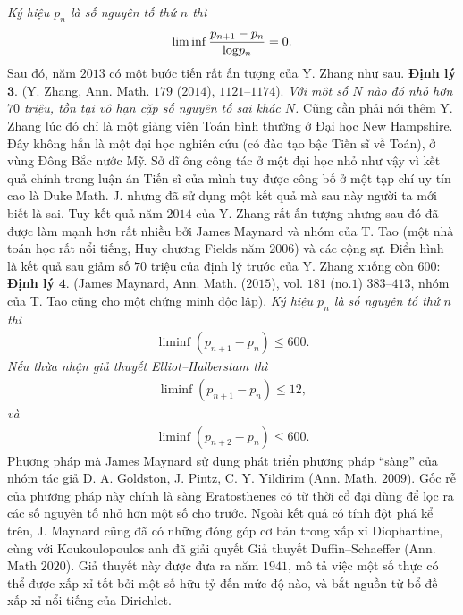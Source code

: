 \begin{multicols}{2}
	\textit{Ký hiệu $p_{n}$ là số nguyên tố thứ $n$ thì}
	\begin{align*}
		\liminf  \frac{p_{n+1}-p_{n}}{{\rm log}p_{n}}=0.
	\end{align*}
	Sau đó, năm $2013$ có một bước tiến rất ấn tượng của Y. Zhang như sau.
	\vskip 0.1cm
	\textbf{\color{duongvaotoanhoc}Định lý} $\pmb{3.}$ (Y. Zhang, Ann. Math. $179$ ($2014$), $1121$--$1174$).
	\textit{Với một số $N$ nào đó nhỏ hơn $70$ triệu, tồn tại vô hạn cặp số nguyên tố sai khác $N$. }
	\vskip 0.1cm
	Cũng cần phải nói thêm Y. Zhang lúc đó chỉ là một giảng viên Toán bình thường ở Đại học New Hampshire. Đây không hẳn là một đại học nghiên cứu (có đào tạo bậc Tiến sĩ về Toán), ở vùng Đông Bắc nước Mỹ. Sở dĩ ông công tác ở một đại học nhỏ như vậy vì kết quả chính trong luận án Tiến sĩ của mình tuy được công bố ở một tạp chí uy tín cao là Duke Math. J. nhưng đã sử dụng một kết quả mà sau này người ta mới biết là sai. Tuy kết quả năm $2014$ của Y. Zhang rất ấn tượng nhưng sau đó đã được làm mạnh hơn rất nhiều bởi James Maynard và nhóm của T. Tao (một nhà toán học rất nổi tiếng, Huy chương Fields năm $2006$) và các cộng sự. Điển hình là kết quả sau giảm số $70$ triệu của định lý trước của Y. Zhang xuống còn $600$:
	\vskip 0.1cm
	\textbf{\color{duongvaotoanhoc}Định lý} $\pmb{4.}$ (James Maynard, Ann. Math. ($2015$), vol. $181$ (no.$1$) $383$--$413$, nhóm của T. Tao cũng cho một chứng minh độc lập).
	\textit{Ký hiệu $p_{n}$ là số nguyên tố thứ $n$ thì}
	\begin{align*}
		\liminf (p_{n+1}-p_{n}) \leq 600. 
	\end{align*}
	\textit{Nếu thừa nhận giả thuyết Elliot--Halberstam thì} 
	\begin{align*}
		\liminf (p_{n+1}-p_{n}) \leq 12,
	\end{align*}
	\textit{và}
	\begin{align*}
		\liminf(p_{n+2}-p_{n}) \leq 600. 
	\end{align*}
	Phương pháp mà James Maynard sử dụng phát triển phương pháp ``sàng'' của nhóm tác giả D. A. Goldston, J. Pintz, C. Y. Yildirim (Ann. Math. $2009$). Gốc rễ của phương pháp này chính là sàng Eratosthenes có từ thời cổ đại dùng để lọc ra các số nguyên tố nhỏ hơn một số cho trước. Ngoài kết quả có tính đột phá kể trên, J. Maynard cũng đã có những đóng góp cơ bản trong xấp xỉ Diophantine, cùng với Koukoulopoulos anh đã giải quyết Giả thuyết Duffin--Schaeffer (Ann. Math $2020$). Giả thuyết này được đưa ra năm $1941$, mô tả việc một số thực có thể được xấp xỉ tốt bởi một số hữu tỷ đến mức độ nào, và bắt nguồn từ bổ đề xấp xỉ nổi tiếng của Dirichlet. 

\end{multicols}
